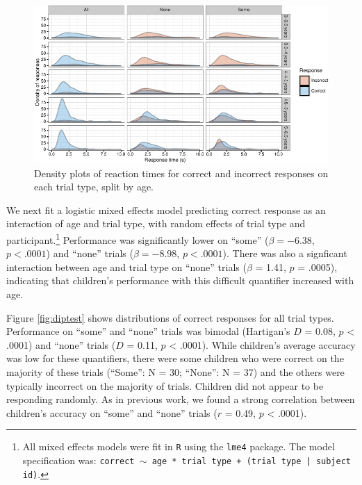 \documentclass[10pt, letterpaper]{article}
\newenvironment{CodeChunk}{}{}
\begin{document}
\begin{CodeChunk}
\begin{figure}[t]

{\centering \includegraphics{figs/dense-1} 

}

\caption[Density plots of reaction times for correct and incorrect responses on each trial type, split by age]{Density plots of reaction times for correct and incorrect responses on each trial type, split by age.}\label{fig:dense}
\end{figure}
\end{CodeChunk}

We next fit a logistic mixed effects model predicting correct response
as an interaction of age and trial type, with random effects of trial
type and
participant.\footnote{All mixed effects models were fit in \texttt{R} using the \texttt{lme4} package. The model specification was: \texttt{correct $\sim$ age * trial type + (trial type | subject id)}.}
Performance was significantly lower on ``some'' (\(\beta = -6.38\),
\(p < .0001\)) and ``none'' trials (\(\beta = -8.98\), \(p < .0001\)).
There was also a signficant interaction between age and trial type on
``none'' trials (\(\beta\) = 1.41, \(p\) = .0005), indicating that
children's performance with this difficult quantifier increased with
age.

Figure \ref{fig:diptest} shows distributions of correct responses for
all trial types. Performance on ``some'' and ``none'' trials was bimodal
(Hartigan's \(D\) = 0.08, \(p\) \textless{} .0001) and ``none'' trials
(\(D\) = 0.11, \(p\) \textless{} .0001). While children's average
accuracy was low for these quantifiers, there were some children who
were correct on the majority of these trials (``Some'': N = 30;
``None'': N = 37) and the others were typically incorrect on the
majority of trials. Children did not appear to be responding randomly.
As in previous work, we found a strong correlation between children's
accuracy on ``some'' and ``none'' trials (\(r\) = 0.49, \(p\)
\textless{} .0001).
\end{document}
